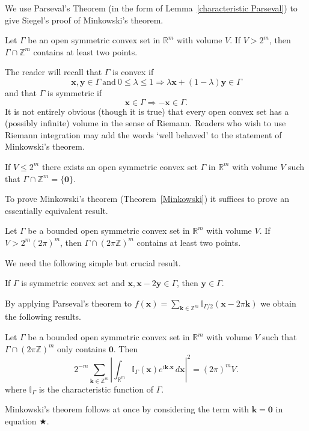 We use Parseval's Theorem (in the form of
Lemma~\ref{characteristic Parseval}) to
give Siegel's proof of Minkowski's
theorem.
\begin{theorem}[Minkowski]\label{Minkowski}
Let $\Gamma$ be an open symmetric  convex set
in ${\mathbb R}^{m}$ with volume $V$.
If $V>2^{m}$, then $\Gamma\cap {\mathbb Z}^{m}$
contains at least two points.
\end{theorem}

The reader will recall that $\Gamma$ is convex if
\[{\mathbf x},{\mathbf y}\in \Gamma
\ \text{and}\ 0\leq\lambda\leq 1
\Rightarrow
\lambda{\mathbf x}+(1-\lambda){\mathbf y}\in \Gamma\]
and that $\Gamma$ is symmetric if
\[{\mathbf x}\in \Gamma
\Rightarrow -{\mathbf x}\in \Gamma.\]
It is not entirely obvious (though it is true)
that every open convex set has a (possibly infinite)
volume in the sense of Riemann. Readers who wish
to use Riemann integration may add the
words `well behaved' to the statement of
Minkowski's theorem.
\begin{lemma} If $V\leq 2^{m}$ there exists
an open symmetric  convex set $\Gamma$
in ${\mathbb R}^{m}$ with volume $V$
such that $\Gamma\cap {\mathbb Z}^{m}=\{{\mathbf 0}\}$.
\end{lemma}

To prove Minkowski's theorem  (Theorem~\ref{Minkowski})
it suffices to prove an essentially equivalent result.
\begin{theorem}
Let $\Gamma$ be a bounded open symmetric  convex set
in ${\mathbb R}^{m}$ with volume $V$.
If $V>2^{m}(2\pi)^{m}$, then $\Gamma\cap(2\pi {\mathbb Z})^{m}$
contains at least two points.
\end{theorem}
We need the following simple but crucial result.
\begin{lemma} If $\Gamma$ is symmetric  convex set
and ${\mathbf x},{\mathbf x}-2{\mathbf y}\in \Gamma$,
then ${\mathbf y}\in \Gamma$.
\end{lemma}
By applying Parseval's theorem to
$f({\mathbf x})=\sum_{{\mathbf k}\in {\mathbb Z}^{m}}
{\mathbb I}_{\Gamma/2}({\mathbf x}-2\pi {\mathbf k})$ we
obtain the following results.
\begin{lemma} Let $\Gamma$ be a bounded open symmetric  convex set
in ${\mathbb R}^{m}$ with volume $V$ such that
$\Gamma\cap(2\pi {\mathbb Z})^{m}$ only contains
${\mathbf 0}$. Then
\begin{equation*}
\tag*{$\bigstar$}
2^{-m}\sum_{{\mathbf k}\in {\mathbb Z}^{m}}
\left|
\int_{{\mathbb R}^{m}}
{\mathbb I}_{\Gamma}({\mathbf x})e^{i{\mathbf k}.{\mathbf x}}
\, d{\mathbf x}
\right|^{2}
=(2\pi)^{m}V.
\end{equation*}
where ${\mathbb I}_{\Gamma}$ is the characteristic function
of $\Gamma$.
\end{lemma}
Minkowski's theorem follows at once by considering the
term with ${\mathbf k}={\mathbf 0}$ in equation
$\bigstar$.

